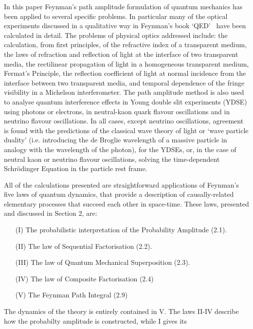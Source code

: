 { 
  In this paper Feynman's path amplitude formulation of quantum mechanics has been applied to several
  specific problems. In particular many of the optical experiments discussed in a qualitative way in
  Feynman's book `QED'~\cite{Feyn1} have been calculated in detail. The problems of physical optics
  addressed include: the calculation, from first principles, of the refractive index of a 
  transparent medium, the laws of refraction and reflection of light at the interface of two transparent 
  media, the rectilinear propagation of light in a homogeneous transparent medium, Fermat's
    Principle, the reflection
   coefficient of light at normal incidence from the interface between two transparent media,
   and temporal dependence of the fringe visibility in a Michelson interferometer. The path amplitude
  method is also used to analyse quantum interference effects in Young double slit experiments (YDSE)
  using photons or electrons, in neutral-kaon quark flavour oscillations and in neutrino
  flavour oscillations. In all cases, except neutrino oscillations, agreement is found
  with the predictions of the classical wave theory of light or `wave particle duality' 
 (i.e. introducing the de Broglie wavelength of a massive particle in analogy with 
  the wavelength of the photon), for the YDSEs, or, 
   in the case of neutral kaon or neutrino flavour oscillations, solving the 
   time-dependent Schr\"{o}dinger Equation in the particle rest frame.
   \par All of the calculations presented are straightforward applications
   of Feynman's five laws of quantum dynamics, that provide a description
   of causally-related elementary processes that succeed each other in space-time. These laws, 
  presented and discussed in Section 2, are:
  \begin{itemize}
   \item[(I)] The probabilistic interpretation of the Probability Amplitude (2.1).
  \item[(II)] The law of Sequential Factorisation (2.2).
  \item[(III)] The law of Quantum Mechanical Superposition (2.3). 
  \item[(IV)] The law of Composite Factorisation (2.4)
  \item[(V)] The Feynman Path Integral (2.9)
  \end{itemize}
  The dynamics of the theory is entirely contained in V. The laws II-IV 
  describe how the probabilty amplitude is constructed, while I gives its
}
